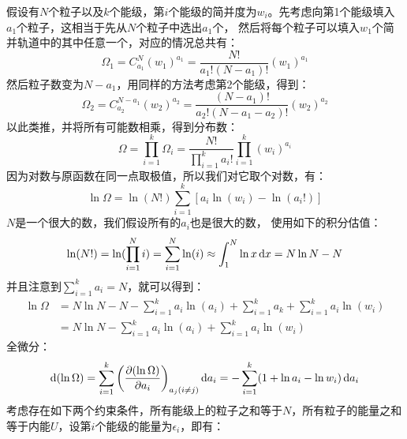 \begin{prove}
    假设有$N$个粒子以及$k$个能级，第$i$个能级的简并度为$w_i$。先考虑向第1个能级填入$a_1$个粒子，这相当于先从$N$个粒子中选出$a_1$个，
    然后将每个粒子可以填入$w_1$个简并轨道中的其中任意一个，对应的情况总共有：
    \begin{equation}
        \Omega_1 =C_{a_1}^{N} (w_1)^{a_1} = \frac{N!}{a_{1}!(N-a_{1})!} (w_1)^{a_1}
    \end{equation}
    然后粒子数变为$N-a_1$，用同样的方法考虑第2个能级，得到：
    \begin{equation}
        \Omega_2 =C_{a_2}^{N-a_1} (w_2)^{a_2} = \frac{(N-a_1)!}{a_{2}!(N-a_{1}-a_{2})!} (w_2)^{a_2}
    \end{equation}
    以此类推，并将所有可能数相乘，得到分布数：
    \begin{equation}
        \Omega = \prod_{i=1}^{k} \Omega_{i} = \frac{N!}{\prod_{i = 1}^{k}a_{i}!}\prod_{i = 1}^{k} (w_i)^{a_i}
    \end{equation}
    因为对数与原函数在同一点取极值，所以我们对它取个对数，有：
    \begin{equation}
        \ln\Omega = \ln(N!)\sum_{i = 1}^{k}[{a_i}\ln(w_i) - \ln(a_i!)]
    \end{equation}
    $N$是一个很大的数，我们假设所有的$a_i$也是很大的数，
    使用如下的积分估值：
    \begin{equation}
        \ln(N!) = \ln(\prod_{i=1}^{N}i)=\sum_{i=1}^{N}\ln(i) \approx \int_{1}^{N}\ln x\dif{x} = N\ln N-N
    \end{equation}
    并且注意到$\sum_{i=1}^{k}a_i=N$，就可以得到：
    \begin{equation}
        \begin{aligned}
            \ln\Omega & = N\ln N-N-\sum_{i=1}^{k}a_{i}\ln(a_i)+\sum_{i=1}^{k}a_k+\sum_{i = 1}^{k}{a_i}\ln(w_i) \\
                      & =N\ln N-\sum_{i=1}^{k}a_{i}\ln(a_i)+\sum_{i = 1}^{k}{a_i}\ln(w_i)
            \label{of_omega}
        \end{aligned}
    \end{equation}
    全微分：
    \begin{equation}
        \dif{(\ln\Omega)} = \sum_{i=1}^{k}\left(\frac{\partial (\ln\Omega)}{\partial a_i}\right)_{a_j(i\neq j)} \dif{a_i} =
        -\sum_{i=1}^{k}(1+\ln a_i-\ln w_i)\dif{a_i}
        \label{of_difOmega}
    \end{equation}
    考虑存在如下两个约束条件，所有能级上的粒子之和等于$N$，所有粒子的能量之和等于内能$U$，设第$i$个能级的能量为$\epsilon_i$，即有：

\end{prove}
